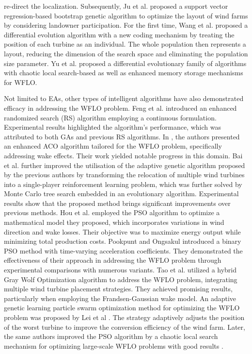 \documentclass[review]{elsarticle}
\begin{document}
re-direct the localization. Subsequently, Ju et al. \cite{ju2019winda} proposed a support vector regression-based bootstrap genetic algorithm to optimize the layout of wind farms by considering landowner participation. For the first time, Wang et al. \cite{wang2017differential} proposed a differential evolution algorithm with a new coding mechanism by treating the position of each turbine as an individual. The whole population then represents a layout, reducing the dimension of the search space and eliminating the population size parameter. Yu et al. \cite{yu2023chaotic} proposed a differential evolutionary family of algorithms with chaotic local search-based as well as enhanced memory storage mechanisms for WFLO.

Not limited to EAs, other types of intelligent algorithms have also demonstrated efficacy in addressing the WFLO problem. Feng et al. \cite{feng2015solving} introduced an enhanced randomized search (RS) algorithm employing a continuous formulation. Experimental results highlighted the algorithm's performance, which was attributed to both GAs and previous RS algorithms. In \cite{erouglu2012design}, the authors presented an enhanced ACO algorithm tailored for the WFLO problem, specifically addressing wake effects. Their work yielded notable progress in this domain. Bai et al. \cite{bai2022wind} further improved the utilisation of the adaptive genetic algorithm proposed by the previous authors by transforming the relocation of multiple wind turbines into a single-player reinforcement learning problem, which was further solved by Monte Carlo tree search embedded in an evolutionary algorithm. Experimental results show that the proposed method brings significant improvements over previous methods. Hou et al. \cite{hou2015optimized} employed the PSO algorithm to optimize a mathematical model they proposed, which incorporates variations in wind direction and wake losses. Their objective was to maximize energy output while minimizing total production costs. Pookpunt and Ongsakul \cite{pookpunt2013optimal} introduced a binary PSO method with time-varying acceleration coefficients. They demonstrated the effectiveness of their approach in addressing the WFLO problem through experimental comparisons with numerous variants. Tao et al. \cite{tao2019optimal} utilized a hybrid Gray Wolf Optimization algorithm to address the WFLO problem, integrating multiple wind turbine placement strategies. They achieved promising results, particularly when employing the Frandsen-Gaussian wake model. An adaptive genetic learning particle swarm optimization method for optimizing the WFLO problem was proposed by Lei et al \cite{lei2022adaptive}. The strategy adaptively adjusts the position of the worst turbine to improve the conversion efficiency of the wind farm. Later, the same authors improved the PSO algorithm by a chaotic local search mechanism for optimizing large-scale WFLO problems with good results \cite{lei2023chaotic}.
\end{document}
